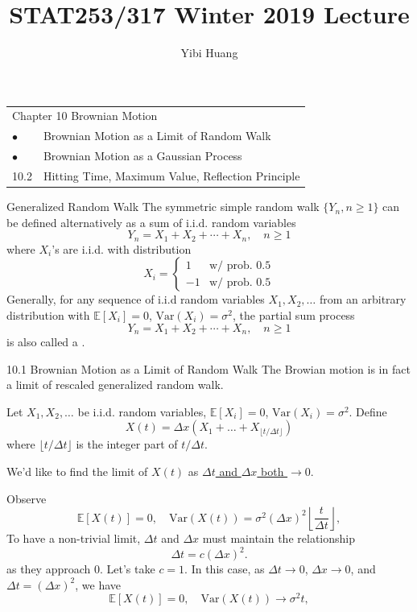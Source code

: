 \documentclass[letterpaper]{beamer}
\title{STAT253/317 Winter 2019 Lecture \chapnum} \date{} \author{Yibi Huang}
\def\E{\mathbb E}
\def\V{\mathrm{Var}}
\def\dt{\Delta}
\begin{document}
\begin{frame}\maketitle
\bigskip
\begin{center}\large
\begin{tabular}{ll}
\multicolumn{2}{l}{Chapter 10  Brownian Motion}\\[5pt]
$\bullet$ & Brownian Motion as a Limit of Random Walk\\
$\bullet$ & Brownian Motion as a Gaussian Process\\
 10.2 & Hitting Time, Maximum Value, Reflection Principle
\end{tabular}
\end{center}
\end{frame}
\begin{frame}{Generalized Random Walk}
The symmetric simple random walk $\{Y_n, n\ge 1\}$ can be defined alternatively as
a sum of i.i.d. random variables
$$
Y_n = X_1+X_2+\cdots+X_n,\quad n\ge 1
$$
where $X_i$'s are i.i.d. with distribution
$$
X_i=\begin{cases}1&\text{w/ prob. }0.5\\-1& \text{w/ prob. }0.5\end{cases}
$$
Generally, for any sequence of i.i.d random variables $X_1,X_2,\ldots$ from an arbitrary distribution with $\E[X_i]=0$, $\V(X_i)=\sigma^2$, the partial sum process
$$
Y_n = X_1+X_2+\cdots+X_n,\quad n\ge 1
$$
is also called a .
\end{frame}
\begin{frame}{10.1 Brownian Motion as a Limit of Random Walk}
The Browian motion is in fact a limit of rescaled generalized random walk.

Let $X_1,X_2,\ldots$ be i.i.d. random variables, $\E[X_i]=0$, $\V(X_i)=\sigma^2$. Define
$$
X(t)=\dt x(X_1+\ldots+X_{\lfloor t/\dt t\rfloor})
$$
where $\lfloor t/\dt t\rfloor$ is the integer part of $t/\dt t$.\par\smallskip
We'd like to find the limit of $X(t)$ as \underline{$\dt t$ and $\dt x$ both $\to 0$}.

Observe
$$
\E[X(t)]=0 ,\quad
\V(X(t))=\sigma^2(\dt x)^2\left\lfloor \frac{t}{\dt t} \right\rfloor,
$$
To have a non-trivial limit, $\dt t$ and $\dt x$ must maintain the relationship
$$\dt t=c(\dt x)^2.$$
as they approach 0.
Let's take $c=1.$ In this case, as $\dt t\to 0$, $\dt x\to 0$, and $\dt t=(\dt x)^2$, we have
$$
\E[X(t)]=0,\quad\V(X(t))\to\sigma^2t,
$$
\end{frame}
\end{document}
